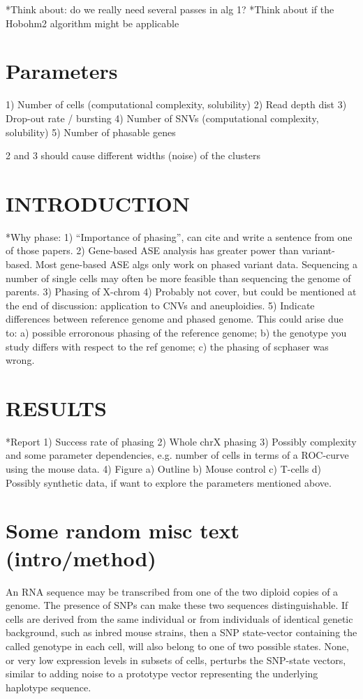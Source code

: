 *Think about: do we really need several passes in alg 1?
*Think about if the Hobohm2 algorithm might be applicable


\section{Parameters}
1) Number of cells (computational complexity, solubility)
2) Read depth dist
3) Drop-out rate / bursting
4) Number of SNVs (computational complexity, solubility)
5) Number of phasable genes

2 and 3 should cause different widths (noise) of the clusters


\section{INTRODUCTION}
*Why phase:
1) ``Importance of phasing'', can cite and write a sentence from one of those papers.
2) Gene-based ASE analysis has greater power than variant-based. Most gene-based ASE algs only work on phased variant data. Sequencing a number of single cells may often be more feasible than sequencing the genome of parents.
3) Phasing of X-chrom
4) Probably not cover, but could be mentioned at the end of
discussion: application to CNVs and aneuploidies.
5) Indicate differences between reference genome and phased
genome. This could arise due to: a) possible erroronous phasing of
the reference genome; b) the genotype you study differs with respect to
the ref genome; c) the phasing of scphaser was wrong.

\section{RESULTS}
*Report
1) Success rate of phasing
2) Whole chrX phasing
3) Possibly complexity and some parameter dependencies, e.g. number of
cells in terms of a ROC-curve using the mouse data.
4) Figure
a) Outline
b) Mouse control
c) T-cells
d) Possibly synthetic data, if want to explore the parameters mentioned above.


\section{Some random misc text (intro/method)}
An RNA sequence may be transcribed from one of the two diploid copies of a genome. The presence of SNPs can make these two sequences distinguishable. If cells are derived from the same individual or from individuals of identical genetic background, such as inbred mouse strains, then a SNP state-vector containing the called genotype in each cell, will also belong to one of two possible states. None, or very low expression levels in subsets of cells, perturbs the SNP-state vectors, similar to adding noise to a prototype vector representing the underlying haplotype sequence. 

